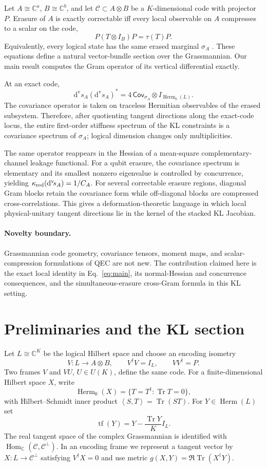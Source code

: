 \documentclass[11pt]{article}
\theoremstyle{definition}
\newcommand{\cC}{\mathcal C}
\newcommand{\Herm}{\operatorname{Herm}}
\newcommand{\Tr}{\operatorname{Tr}}
\newcommand{\tf}{\operatorname{tf}}
\newcommand{\C}{\mathbb C}
\newcommand{\inner}[2]{\left\langle #1,#2\right\rangle}
\newcommand{\dvs}{\mathrm d^{\mathrm v}\!s}
\begin{document}
Let $A\cong\C^a$, $B\cong\C^b$, and let $\cC\subset A\otimes B$ be a $K$-dimensional code with projector $P$. Erasure of $A$ is exactly correctable iff every local observable on $A$ compresses to a scalar on the code,
\begin{equation}
P(T\otimes I_B)P=\tau(T)P.
\label{eq:KL}
\end{equation}
Equivalently, every logical state has the same erased marginal $\sigma_A$ \cite{Kretschmann,Beny}. These equations define a natural vector-bundle section over the Grassmannian. Our main result computes the Gram operator of its vertical differential exactly.

At an exact code,
\begin{equation}
\boxed{\dvs_A(\dvs_A)^*=4\,\mathsf{Cov}_{\sigma_A}\otimes I_{\Herm_0(L)}}.
\label{eq:main}
\end{equation}
The covariance operator is taken on traceless Hermitian observables of the erased subsystem. Therefore, after quotienting tangent directions along the exact-code locus, the entire first-order stiffness spectrum of the KL constraints is a covariance spectrum of $\sigma_A$; logical dimension changes only multiplicities.

The same operator reappears in the Hessian of a mean-square complementary-channel leakage functional. For a qubit erasure, the covariance spectrum is elementary and its smallest nonzero eigenvalue is controlled by concurrence, yielding $\kappa_{\rm red}(\dvs_A)=1/C_A$. For several correctable erasure regions, diagonal Gram blocks retain the covariance form while off-diagonal blocks are compressed cross-correlations. This gives a deformation-theoretic language in which local physical-unitary tangent directions lie in the kernel of the stacked KL Jacobian.

\paragraph{Novelty boundary.} Grassmannian code geometry, covariance tensors, moment maps, and scalar-compression formulations of QEC are not new. The contribution claimed here is the exact local identity in Eq.~\eqref{eq:main}, its normal-Hessian and concurrence consequences, and the simultaneous-erasure cross-Gram formula in this KL setting.

\section{Preliminaries and the KL section}
Let $L\cong\C^K$ be the logical Hilbert space and choose an encoding isometry
\[
V:L\to A\otimes B,\qquad V^\dagger V=I_L,\qquad VV^\dagger=P.
\]
Two frames $V$ and $VU$, $U\in U(K)$, define the same code. For a finite-dimensional Hilbert space $X$, write
\[
\Herm_0(X)=\{T=T^\dagger:\Tr T=0\},
\]
with Hilbert--Schmidt inner product $\inner{S}{T}=\Tr(ST)$. For $Y\in\Herm(L)$ set
\[
\tf(Y)=Y-\frac{\Tr Y}{K}I_L.
\]
The real tangent space of the complex Grassmannian is identified with $\operatorname{Hom}_{\C}(\cC,\cC^\perp)$. In an encoding frame we represent a tangent vector by $X:L\to\cC^\perp$ satisfying $V^\dagger X=0$ and use metric $g(X,Y)=\Re\Tr(X^\dagger Y)$.
\end{document}
